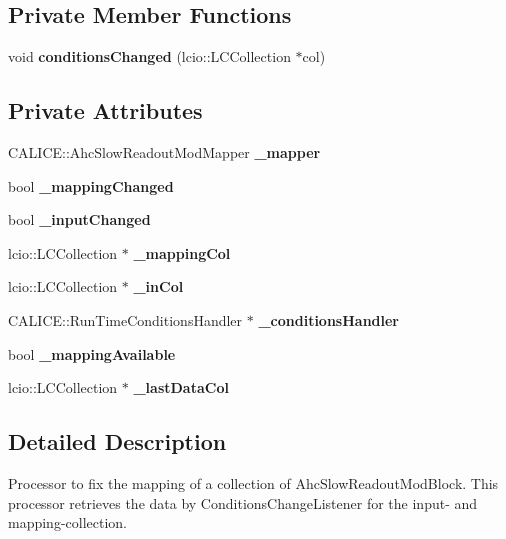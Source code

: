 \subsection*{Private Member Functions}
\begin{DoxyCompactItemize}
\item 
void {\bfseries conditionsChanged} (lcio::LCCollection $\ast$col)\label{classAhcSROmappingProcessor_ae67481b63f80aba4e19fdd12c4a74da4}

\end{DoxyCompactItemize}
\subsection*{Private Attributes}
\begin{DoxyCompactItemize}
\item 
CALICE::AhcSlowReadoutModMapper {\bfseries \_\-mapper}\label{classAhcSROmappingProcessor_a7d712eeff246abd6edd2ecee49fb5777}

\item 
bool {\bfseries \_\-mappingChanged}\label{classAhcSROmappingProcessor_a8486c29c571d160450e616e6484ee243}

\item 
bool {\bfseries \_\-inputChanged}\label{classAhcSROmappingProcessor_a285e84531df4faeaea3018b8a0a06b32}

\item 
lcio::LCCollection $\ast$ {\bfseries \_\-mappingCol}\label{classAhcSROmappingProcessor_a631ea134f436b99ee520fd705a8d392a}

\item 
lcio::LCCollection $\ast$ {\bfseries \_\-inCol}\label{classAhcSROmappingProcessor_ad60fb94a5944f4575563149537e02feb}

\item 
CALICE::RunTimeConditionsHandler $\ast$ {\bfseries \_\-conditionsHandler}\label{classAhcSROmappingProcessor_a13e326e568c0a3ba6b6b4fe6cfca5ab1}

\item 
bool {\bfseries \_\-mappingAvailable}\label{classAhcSROmappingProcessor_a33de2e4f529735385931b547914446b2}

\item 
lcio::LCCollection $\ast$ {\bfseries \_\-lastDataCol}\label{classAhcSROmappingProcessor_a0df24f16b476f7d484caefc258294e5a}

\end{DoxyCompactItemize}


\subsection{Detailed Description}
Processor to fix the mapping of a collection of AhcSlowReadoutModBlock. This processor retrieves the data by ConditionsChangeListener for the input-\/ and mapping-\/collection.

